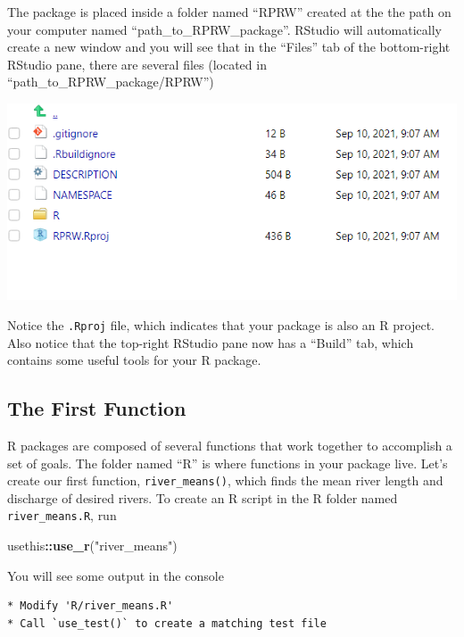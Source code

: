 \documentclass[
]{book}
\newenvironment{Shaded}{\begin{snugshade}}{\end{snugshade}}
\newcommand{\KeywordTok}[1]{\textcolor[rgb]{0.13,0.29,0.53}{\textbf{#1}}}
\newcommand{\NormalTok}[1]{#1}
\newcommand{\OperatorTok}[1]{\textcolor[rgb]{0.81,0.36,0.00}{\textbf{#1}}}
\newcommand{\StringTok}[1]{\textcolor[rgb]{0.31,0.60,0.02}{#1}}
\begin{document}
The package is placed inside a folder named ``RPRW'' created at the the path on your computer named ``path\_to\_RPRW\_package''. RStudio will automatically create a new window and you will see that in the ``Files'' tab of the bottom-right RStudio pane, there are several files (located in ``path\_to\_RPRW\_package/RPRW'')

\includegraphics[width=1\linewidth]{images/newrpack_files}

Notice the \texttt{.Rproj} file, which indicates that your package is also an R project. Also notice that the top-right RStudio pane now has a ``Build'' tab, which contains some useful tools for your R package.

\hypertarget{first-function}{%
\subsection{The First Function}\label{first-function}}

R packages are composed of several functions that work together to accomplish a set of goals. The folder named ``R'' is where functions in your package live. Let's create our first function, \texttt{river\_means()}, which finds the mean river length and discharge of desired rivers. To create an R script in the R folder named \texttt{river\_means.R}, run

\begin{Shaded}
\begin{Highlighting}[]
\NormalTok{usethis}\OperatorTok{::}\KeywordTok{use_r}\NormalTok{(}\StringTok{"river_means"}\NormalTok{)}
\end{Highlighting}
\end{Shaded}

You will see some output in the console

\begin{verbatim}
* Modify 'R/river_means.R'
* Call `use_test()` to create a matching test file 
\end{verbatim}
\end{document}
